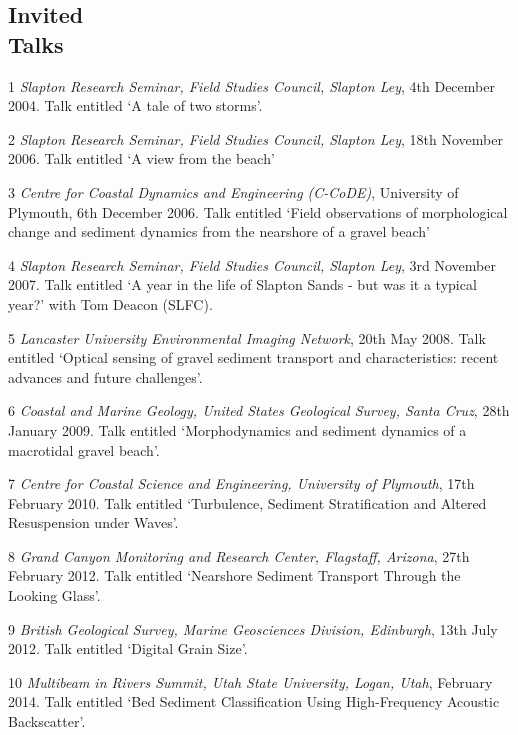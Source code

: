 \documentclass[margin,line]{resume}
\begin{document}
\begin{resume}
 	\section{\mysidestyle Invited \\Talks}
       \begin{footnotesize}
 	\begin{list1}
 	\item[1] {\sl Slapton Research Seminar, Field Studies Council, Slapton Ley}, 4th December 2004. Talk entitled `A tale of two storms'.\\
 	\item[2] {\sl Slapton Research Seminar, Field Studies Council, Slapton Ley}, 18th November 2006. Talk entitled `A view from the beach'\\
 	\item[3] {\sl Centre for Coastal Dynamics and Engineering (C-CoDE)}, University of Plymouth, 6th December 2006.  Talk entitled `Field observations of morphological change and sediment dynamics from the nearshore of a gravel beach'\\
 	\item[4] {\sl Slapton Research Seminar, Field Studies Council, Slapton Ley}, 3rd November 2007. Talk entitled `A year in the life of Slapton Sands - but was it a typical year?' with Tom Deacon (SLFC).\\
 	\item[5] {\sl Lancaster University Environmental Imaging Network}, 20th May 2008. Talk entitled `Optical sensing of gravel sediment transport and characteristics: recent advances and future challenges'.\\
         \item[6] {\sl Coastal and Marine Geology, United States Geological Survey, Santa Cruz}, 28th January 2009. Talk entitled `Morphodynamics and sediment dynamics of a macrotidal gravel beach'.\\
         \item[7] {\sl Centre for Coastal Science and Engineering, University of Plymouth}, 17th February 2010. Talk entitled `Turbulence, Sediment Stratification and Altered Resuspension under Waves'.\\
         \item[8] {\sl Grand Canyon Monitoring and Research Center, Flagstaff, Arizona}, 27th February 2012. Talk entitled `Nearshore Sediment Transport Through the Looking Glass'.\\
         \item[9] {\sl British Geological Survey, Marine Geosciences Division, Edinburgh}, 13th July 2012. Talk entitled `Digital Grain Size'. \\
         \item[10] {\sl Multibeam in Rivers Summit, Utah State University, Logan, Utah}, February 2014. Talk entitled `Bed Sediment Classification Using High-Frequency Acoustic Backscatter'. 


\end{list1}
\end{footnotesize}
\end{resume}
\end{document}
